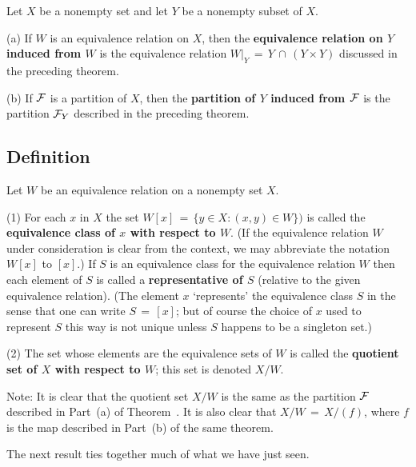 {        Let $X$ be a nonempty set and let $Y$ be a nonempty subset of $X$.

\V

        (a) If $W$ is an equivalence relation on $X$, then the {\bf equivalence relation on $Y$ induced from $W$} is the equivalence relation $W|_{Y} \,=\, Y\,{\cap}\,(Y{\times}Y)$ discussed in the preceding theorem.

\V

        (b)  If ${\cal F}$ is a partition of $X$, then the {\bf partition of $Y$ induced from ${\cal F}$} is the partition ${\cal F}_{Y}$ described in the preceding theorem.
    

 
        \subsection{\small{{\bf Definition}}}
                \label{DefA50.120}

        Let $W$ be an equivalence relation on a nonempty set $X$.

\V

        (1) For each $x$ in $X$ the set $W[x] \,=\, \{y{\in}X: (x,y){\in}W\})$ is called the {\bf equivalence class of $x$ with respect to $W$}.
    (If the equivalence relation $W$ under consideration is clear from the context,  we may abbreviate the notation $W[x]$ to $[x]$.)
    If $S$ is an equivalence class for the equivalence relation $W$ then each element of $S$ is called a {\bf representative of $S$} (relative to the given equivalence relation).
    (The element $x$ `represents' the equivalence class $S$ in the sense that one can write $S \,=\, [x]$;
    but of course the choice of $x$ used to represent $S$ this way is not unique unless $S$ happens to be a singleton set.)

\V

        (2) The set whose elements are the equivalence sets of $W$ is called the {\bf quotient set of $X$ with respect to $W$}; this set is denoted $X/W$.

\V

        Note: It is clear that the quotient set $X/W$ is the same as the partition ${\cal F}$ described in Part~(a) of Theorem~.
    It is also clear that $X/W \,=\, X/(f)$, where $f$ is the map described in Part~(b) of the same theorem.


\V
\V

        The next result ties together much of what we have just seen.


}
